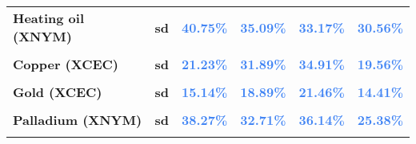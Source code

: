 \documentclass[
  authoryear,
  preprint,
  3p]{elsarticle}
\begin{document}
\begin{longtable}[t]{>{}l>{}l>{}r>{}r>{}r>{}r}
\textbf{Heating oil (XNYM)} & \textbf{sd} & \textcolor[HTML]{4285f4}{\textbf{40.75\%}} & \textcolor[HTML]{4285f4}{\textbf{35.09\%}} & \textcolor[HTML]{4285f4}{\textbf{33.17\%}} & \textcolor[HTML]{4285f4}{\textbf{30.56\%}}\\
\textbf{\cellcolor{gray!10}{Copper (XCEC)}} & \textbf{\cellcolor{gray!10}{mean}} & \textcolor[HTML]{4285f4}{\textbf{\cellcolor{gray!10}{1.45\%}}} & \textcolor[HTML]{4285f4}{\textbf{\cellcolor{gray!10}{*28.15\%}}} & \textcolor[HTML]{4285f4}{\textbf{\cellcolor{gray!10}{6.19\%}}} & \textcolor[HTML]{4285f4}{\textbf{\cellcolor{gray!10}{-0.1\%}}}\\
\textbf{Copper (XCEC)} & \textbf{sd} & \textcolor[HTML]{4285f4}{\textbf{21.23\%}} & \textcolor[HTML]{4285f4}{\textbf{31.89\%}} & \textcolor[HTML]{4285f4}{\textbf{34.91\%}} & \textcolor[HTML]{4285f4}{\textbf{19.56\%}}\\
\addlinespace
\textbf{\cellcolor{gray!10}{Gold (XCEC)}} & \textbf{\cellcolor{gray!10}{mean}} & \textcolor[HTML]{4285f4}{\textbf{\cellcolor{gray!10}{4.5\%}}} & \textcolor[HTML]{4285f4}{\textbf{\cellcolor{gray!10}{14.35\%}}} & \textcolor[HTML]{4285f4}{\textbf{\cellcolor{gray!10}{14.01\%}}} & \textcolor[HTML]{4285f4}{\textbf{\cellcolor{gray!10}{0.53\%}}}\\
\textbf{Gold (XCEC)} & \textbf{sd} & \textcolor[HTML]{4285f4}{\textbf{15.14\%}} & \textcolor[HTML]{4285f4}{\textbf{18.89\%}} & \textcolor[HTML]{4285f4}{\textbf{21.46\%}} & \textcolor[HTML]{4285f4}{\textbf{14.41\%}}\\
\textbf{\cellcolor{gray!10}{Palladium (XNYM)}} & \textbf{\cellcolor{gray!10}{mean}} & \textcolor[HTML]{4285f4}{\textbf{\cellcolor{gray!10}{9.12\%}}} & \textcolor[HTML]{4285f4}{\textbf{\cellcolor{gray!10}{9.03\%}}} & \textcolor[HTML]{4285f4}{\textbf{\cellcolor{gray!10}{*29.12\%}}} & \textcolor[HTML]{4285f4}{\textbf{\cellcolor{gray!10}{13.75\%}}}\\
\textbf{Palladium (XNYM)} & \textbf{sd} & \textcolor[HTML]{4285f4}{\textbf{38.27\%}} & \textcolor[HTML]{4285f4}{\textbf{32.71\%}} & \textcolor[HTML]{4285f4}{\textbf{36.14\%}} & \textcolor[HTML]{4285f4}{\textbf{25.38\%}}\\
\textbf{\cellcolor{gray!10}{Platinum (XNYM)}} & \textbf{\cellcolor{gray!10}{mean}} & \textcolor[HTML]{4285f4}{\textbf{\cellcolor{gray!10}{12.93\%}}} & \textcolor[HTML]{4285f4}{\textbf{\cellcolor{gray!10}{10.56\%}}} & \textcolor[HTML]{4285f4}{\textbf{\cellcolor{gray!10}{7.29\%}}} & \textcolor[HTML]{4285f4}{\textbf{\cellcolor{gray!10}{-7.92\%}}}\\

\end{longtable}
\end{document}
